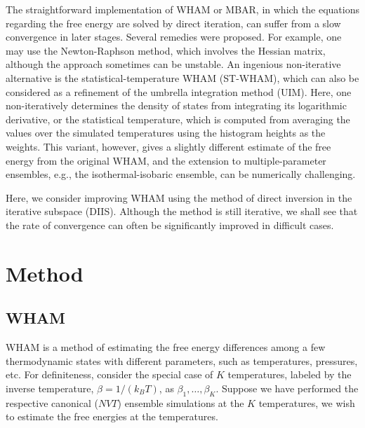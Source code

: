 \documentclass[reprint,aip,jcp,superscriptaddress]{revtex4-1}
\begin{document}
The straightforward implementation of WHAM or MBAR,
in which the equations regarding the free energy
are solved by direct iteration,
can suffer from
a slow convergence in later stages.
%
Several remedies were proposed\cite{
shirts2008, bereau2009, kim2011}.
%
For example, one may use the Newton-Raphson method,
which involves the Hessian matrix,
although the approach sometimes can be unstable\cite{
shirts2008}.
%
An ingenious non-iterative alternative is
the statistical-temperature WHAM (ST-WHAM)\cite{
kim2011},
which can also be considered as a refinement of
the umbrella integration method (UIM)\cite{
kastner2005}.
%
Here,
one non-iteratively determines the density of states
from integrating its logarithmic derivative,
or the statistical temperature,
which is computed from averaging the values
over the simulated temperatures
using the histogram heights as the weights.
%
This variant, however, gives
a slightly different estimate of the free energy
from the original WHAM,
and the extension to multiple-parameter ensembles,
e.g., the isothermal-isobaric ensemble,
can be numerically challenging\cite{kim2011}.



Here, we consider improving WHAM using
the method of direct inversion in the iterative subspace (DIIS)\cite{
pulay1980, *pulay1982, *hamilton1986,
kovalenko1999, howard2011}.
%
Although the method is still iterative,
we shall see that
the rate of convergence can often be
significantly improved in difficult cases.





\section{Method}





\subsection{WHAM}



WHAM is a method of
estimating the free energy differences
among a few thermodynamic states
with different parameters,
such as temperatures, pressures, etc.
%
For definiteness,
consider the special case of $K$ temperatures,
labeled by the inverse temperature,
$\beta = 1/(k_B T)$,
as
$\beta_1, \ldots, \beta_K$.
%
Suppose we have performed the respective
canonical ($NVT$) ensemble simulations
at the $K$ temperatures,
we wish to estimate the free energies
at the temperatures.
\end{document}
